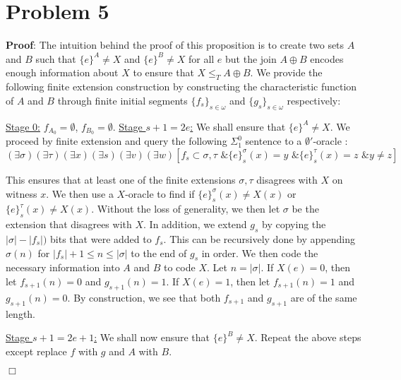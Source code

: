 \documentclass[11pt]{article}
\def\endproofmark{$\Box$}
\newenvironment{proof}{\par{\bf Proof}:}{\endproofmark\smallskip}
\begin{document}
\section*{Problem 5}
\begin{proof}
 The intuition behind the proof of this proposition is to create two sets $A$ and $B$ such that $\{e\}^A \neq X$ and $\{e\}^B \neq X$ for all $e$ but the join $A \oplus B$ encodes enough information about $X$ to ensure that $X \leq_T A \oplus B$.
 We provide the following finite extension construction by constructing the characteristic function of $A$ and $B$ through finite initial segments $\{f_{s}\}_{s \in \omega}$ and $\{g_{s}\}_{s \in \omega}$ respectively: \newline 
 
 \underline{Stage 0:} $f_{A_0} = \emptyset$, $f_{B_0} = \emptyset$. \newline \newline
 \underline{Stage $s+1 = 2e$:} We shall ensure that $\{e\}^{A} \neq X$. We proceed by finite extension and query the following $\Sigma^0_1$ sentence to a $\emptyset'$-oracle  :
  \begin{equation}
    (\exists \sigma)(\exists \tau) (\exists x)(\exists s)(\exists v)(\exists w)[f_s \subset \sigma,\tau \text{ \& } \{e\}^{\sigma}_s(x) = y \text{ \& } \{e\}^{\tau}_s(x) = z \text{ \& } y \neq z]
  \end{equation}

  This ensures that at least one of the finite extensions $\sigma,\tau$ disagrees with $X$ on witness $x$. We then use a $X$-oracle to find if $\{e\}^{\sigma}_s(x) \neq X(x)$ or $\{e\}^{\tau}_s(x) \neq X(x)$. Without the loss of generality, we then let $\sigma$ be the extension that disagrees with $X$. In addition, we extend $g_s$ by copying the $|\sigma| - |f_{s}|)$ bits that were added to $f_{s}$. This can be recursively done by
  appending $\sigma(n)$ for $|f_{s}|+1 \leq n \leq |\sigma|$ to the end of $g_s$ in order. We then code the necessary information into $A$ and $B$ to code $X$. Let $n = |\sigma|$. If $X(e) = 0$, then let $f_{s+1}(n) = 0$ and $g_{s+1}(n) = 1$. If $X(e) = 1$, then let $f_{s+1}(n) = 1$ and $g_{s+1}(n) = 0$. By construction, we see that both $f_{s+1}$ and $g_{s+1}$ are of the same length. \newline
  
  \underline{Stage $s+1 = 2e+1$:} We shall now ensure that $\{e\}^{B} \neq X$. Repeat the above steps except replace  $f$ with $g$ and $A$ with $B$. \newline
  

\end{proof}
\end{document}
